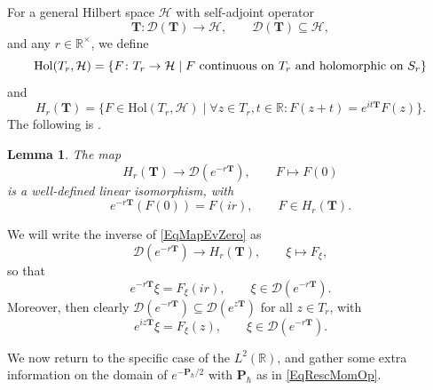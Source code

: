\documentclass[11pt, reqno]{amsart}
\newtheorem{lemma}[theorem]{Lemma}
\theoremstyle{definition}
\numberwithin{equation}{section}
\def\msD{\mathscr D}
\def\R{\mathbb R}
\newcommand{\Hsp}{\mathcal{H}}
\newcommand{\Pb}{\mathbf{P}}
\newcommand{\Tb}{\mathbf{T}}
\newcommand{\Hol}{\mathrm{Hol}}
\begin{document}
For a general Hilbert space $\Hsp$ with self-adjoint operator 
\[
\Tb\colon  \msD(\Tb) \rightarrow \Hsp,\qquad \msD(\Tb) \subseteq \Hsp, 
\]
and any $r\in \R^{\times}$, we define 
\[
\Hol(T_r,\Hsp) =  \{F\colon  T_r \rightarrow \Hsp \mid F\textrm{ continuous on $ T_r $ and holomorphic on }S_r\}
\] 
and
\[
H_r(\Tb) = \{F \in \Hol(T_r,\Hsp)\mid \forall z\in T_r, t\in \R: F(z+t) = e^{it\Tb}F(z)\}.
\]
The following is \cite[Lemma VI.2.3]{Tak03}.
\begin{lemma}
The map
\begin{equation}\label{EqMapEvZero}
H_r(\Tb) \rightarrow \msD(e^{-r\Tb}),\qquad F \mapsto F(0)
\end{equation}
is a well-defined linear isomorphism, with
\[
e^{-r\Tb}(F(0))= F(ir),\qquad F \in H_r(\Tb).
\]
\end{lemma}
We will write the inverse of \eqref{EqMapEvZero} as
\begin{equation}\label{EqIdDom}
\msD(e^{-r\Tb}) \rightarrow  H_r(\Tb),\qquad \xi \mapsto F_{\xi},
\end{equation}
so that
\[
e^{-r\Tb}\xi = F_{\xi}(ir),\qquad \xi\in \msD(e^{-r\Tb}).
\]
Moreover, then clearly $\msD(e^{-r\Tb}) \subseteq\msD(e^{z\Tb})$ for all $z\in T_r$, with 
\begin{equation}\label{EqRestF}
e^{iz\Tb}\xi = F_{\xi}(z),\qquad \xi \in \msD(e^{-r\Tb}).
\end{equation}

We now return to the specific case of the $L^2(\R)$, and gather some extra information on the domain of $e^{-\Pb_{\hbar}/2}$ with $\Pb_{\hbar}$ as in \eqref{EqRescMomOp}. 
\end{document}
